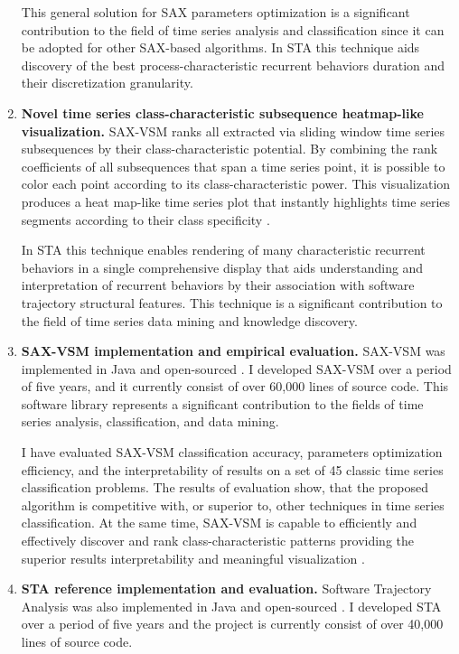 \begin{enumerate}
This general solution for SAX parameters optimization is a significant contribution to the field of time 
series analysis and classification since it can be adopted for other SAX-based algorithms. 
In STA this technique aids discovery of the best process-characteristic recurrent behaviors duration and 
their discretization granularity.

\item \textbf{Novel time series class-characteristic subsequence heatmap-like visualization.}
\mbox{SAX-VSM} ranks all extracted via sliding window time series subsequences by their class-characteristic potential. 
By combining the rank coefficients of all subsequences that span a time series point, it is possible to color each point 
according to its class-characteristic power. 
This visualization produces a heat map-like time series plot that instantly highlights time series  segments 
according to their class specificity \cite{sax-vsm}.

In STA this technique enables rendering of many characteristic recurrent behaviors in a single comprehensive display 
that aids understanding and interpretation of recurrent behaviors by their association with software trajectory structural features. 
This technique is a significant contribution to the field of time series data mining and knowledge discovery.

\item \textbf{SAX-VSM implementation and empirical evaluation.}
SAX-VSM was implemented in Java and open-sourced \cite{jmotif}. I developed SAX-VSM over a period of five years,
and it currently consist of over 60,000 lines of source code. This software library represents a significant 
contribution to the fields of time series analysis, classification, and data mining.

I have evaluated SAX-VSM classification accuracy, parameters optimization efficiency, and the interpretability 
of results on a set of 45 classic time series classification problems. The results of evaluation show, 
that the proposed algorithm is competitive with, or superior to, other techniques in time series classification. 
At the same time, SAX-VSM is capable to efficiently and effectively discover and rank class-characteristic 
patterns providing the superior results interpretability and meaningful visualization \cite{sax-vsm}.

\item \textbf{STA reference implementation and evaluation.}
Software Trajectory Analysis was also implemented in Java and open-sourced \cite{sta-source}. 
I developed STA over a period of five years and the project is currently consist of over 40,000 lines of source code.


\end{enumerate}
